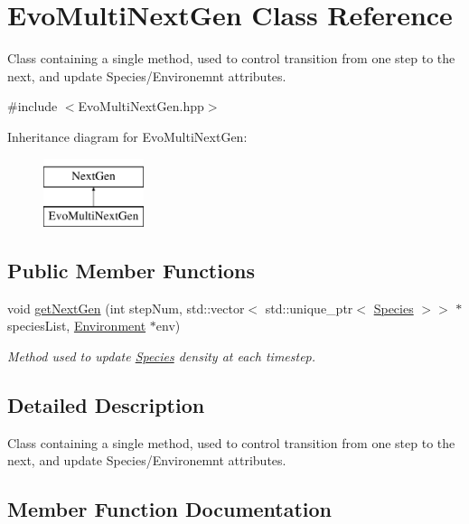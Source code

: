 \hypertarget{classEvoMultiNextGen}{}\section{Evo\+Multi\+Next\+Gen Class Reference}
\label{classEvoMultiNextGen}


Class containing a single method, used to control transition from one step to the next, and update Species/\+Environemnt attributes.  




{\ttfamily \#include $<$Evo\+Multi\+Next\+Gen.\+hpp$>$}

Inheritance diagram for Evo\+Multi\+Next\+Gen\+:\begin{figure}[H]
\begin{center}
\leavevmode
\includegraphics[height=2.000000cm]{classEvoMultiNextGen}
\end{center}
\end{figure}
\subsection*{Public Member Functions}
\begin{DoxyCompactItemize}
\item 
void \hyperlink{classEvoMultiNextGen_acab6fd876dc02feae353b52461b88861}{get\+Next\+Gen} (int step\+Num, std\+::vector$<$ std\+::unique\+\_\+ptr$<$ \hyperlink{classSpecies}{Species} $>$$>$ $\ast$species\+List, \hyperlink{classEnvironment}{Environment} $\ast$env)
\begin{DoxyCompactList}\small\item\em Method used to update \hyperlink{classSpecies}{Species} density at each timestep. \end{DoxyCompactList}\end{DoxyCompactItemize}


\subsection{Detailed Description}
Class containing a single method, used to control transition from one step to the next, and update Species/\+Environemnt attributes. 

\subsection{Member Function Documentation}
\mbox{\label{classEvoMultiNextGen_acab6fd876dc02feae353b52461b88861}} 

